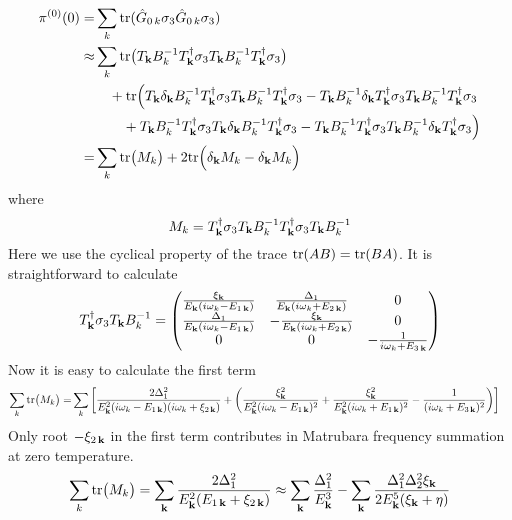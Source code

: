 \begin{equation}\label{eq:pathInt2:pi0long}
\begin{split}
\pi^{(0)}(0)=&\sum_k\text{tr}(\hat{G}_{0\,k}\sigma_3\hat{G}_{0\,k}\sigma_3)\\
	\approx&\sum_k\text{tr}\big(T_{\mathbf{k}}B_{k}^{-1}T_{\mathbf{k}}^{\dagger}\sigma_3T_{\mathbf{k}}B_{k}^{-1}T_{\mathbf{k}}^{\dagger}\sigma_3\big)\\
	&\quad+\text{tr}\Big(T_{\mathbf{k}}\delta_{\mathbf{k}}B_{k}^{-1}T_{\mathbf{k}}^{\dagger}\sigma_3T_{\mathbf{k}}B_{k}^{-1}T_{\mathbf{k}}^{\dagger}\sigma_3
	-T_{\mathbf{k}}B_{k}^{-1}\delta_{\mathbf{k}}T_{\mathbf{k}}^{\dagger}\sigma_3T_{\mathbf{k}}B_{k}^{-1}T_{\mathbf{k}}^{\dagger}\sigma_3\\
	&\qquad+T_{\mathbf{k}}B_{k}^{-1}T_{\mathbf{k}}^{\dagger}\sigma_3T_{\mathbf{k}}\delta_{\mathbf{k}}B_{k}^{-1}T_{\mathbf{k}}^{\dagger}\sigma_3
	-T_{\mathbf{k}}B_{k}^{-1}T_{\mathbf{k}}^{\dagger}\sigma_3T_{\mathbf{k}}B_{k}^{-1}\delta_{\mathbf{k}}T_{\mathbf{k}}^{\dagger}\sigma_3\Big)\\
	=&\sum_k\text{tr}\big(M_{k}\big)+2\text{tr}\Big(\delta_{\mathbf{k}}M_{k}-\delta_{\mathbf{k}}M_{k}\Big)
\end{split}
\end{equation}
where 
\begin{equation}
M_{k}=T_{\mathbf{k}}^{\dagger}\sigma_3T_{\mathbf{k}}B_{k}^{-1}T_{\mathbf{k}}^{\dagger}\sigma_3T_{\mathbf{k}}B_{k}^{-1}
\end{equation}
Here we use the cyclical  property of the trace $\text{tr}(AB)=\text{tr}(BA)$.  
It is straightforward to calculate
\begin{equation*}
T_{\mathbf{k}}^{\dagger}\sigma_3T_{\mathbf{k}}B_{k}^{-1}=
\begin{pmatrix}
{\frac{\xi_{\ensuremath{\mathbf{k}}}}{E_{\ensuremath{\mathbf{k}}}(i\omega_{k}-E_{1\,\ensuremath{\mathbf{k}}})}}&\frac{\Delta_{1}}{E_{\mathbf{k}}(i\omega_{k}+E_{2\,\mathbf{k}})}&0\\
{\frac{\Delta_{1}}{E_{\mathbf{k}}(i\omega_{k}-E_{1\,\mathbf{k}})}}&-\frac{\xi_{\mathbf{k}}}{E_{\mathbf{k}}(i\omega_{k}+E_{2\,\mathbf{k}})}&0\\
0&0&-\frac{1}{i\omega_{k}+E_{3\,\mathbf{k}}}\\
\end{pmatrix}
\end{equation*}
Now it is easy to calculate the first term
\begin{equation}
\begin{split}
\sum_k\text{tr}\big(M_{k}\big)=&
\sum_{k}\left[
\frac{2\Delta_{1}^{2}}{E_{\mathbf{k}}^{2}(i\omega_{k}-E_{1\,\mathbf{k}})(i\omega_{k}+\xi_{2\,\mathbf{k}})}+
\left(\frac{\xi_{\mathbf{k}}^{2}}{E_{\mathbf{k}}^{2}(i\omega_{k}-E_{1\,\mathbf{k}})^{2}}+\frac{\xi_{\mathbf{k}}^{2}}{E_{\mathbf{k}}^{2}(i\omega_{k}+E_{1\,\mathbf{k}})^{2}}
-\frac{1}{(i\omega_{k}+E_{3\,\mathbf{k}})^{2}}\right)
\right]
\end{split}
\end{equation}
Only root $-\xi_{2\,\mathbf{k}}$ in the first term contributes in Matrubara frequency summation at zero temperature.
\begin{equation}\label{eq:pathInt2:pi0-1}
\sum_k\text{tr}\big(M_{k}\big)=\sum_{\mathbf{k}}\frac{2\Delta_{1}^{2}}{E_{\mathbf{k}}^{2}(E_{1\,\mathbf{k}}+\xi_{2\,\mathbf{k}})}
\approx\sum_{\mathbf{k}}\frac{\Delta_{1}^{2}}{E_{\mathbf{k}}^{3}}-\sum_{\mathbf{k}}\frac{\Delta_{1}^{2}\Delta_{2}^{2}\xi_{\mathbf{k}}}{2E_{\mathbf{k}}^{5}(\xi_{\mathbf{k}}+\eta)}
\end{equation}

